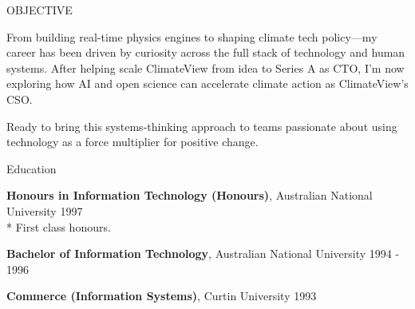 \documentclass{resume} %
\begin{document}

\begin{rSection}{OBJECTIVE}

    From building real-time physics engines to shaping climate tech
    policy—my career has been driven by curiosity across the full
    stack of technology and human systems. After helping scale
    ClimateView from idea to Series A as CTO, I'm now exploring how AI
    and open science can accelerate climate action as ClimateView's
    CSO.

    Ready to bring this systems-thinking approach to teams passionate
    about using technology as a force multiplier for positive change.

  \iffalse{
    I thrive in the messy middle where complex technical challenges
    meet real-world impact. Whether it was creating haptic VR
    simulations, building learning platforms, or now architecting
    climate transition frameworks used by 230+ cities, I've spent 20+
    years making the technically possible practically useful.

    Seeking to join a team where deep technical craft, collaborative
    mentorship, and meaningful outcomes intersect.
  }\fi
  
\end{rSection}



\begin{rSection}{Education}

  {\bf Honours in Information Technology (Honours)}, Australian National University \hfill {1997}\\*
  First class honours.

  {\bf Bachelor of Information Technology}, Australian National University \hfill {1994 - 1996}

  {\bf Commerce (Information Systems)}, Curtin University \hfill {1993}

\end{rSection}
\end{document}
